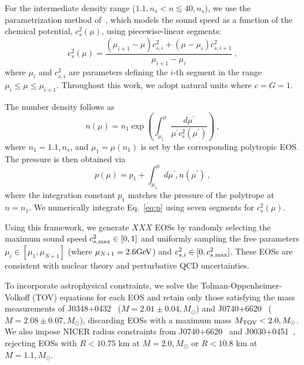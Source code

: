 \documentclass[twocolumn]{aastex631}
\begin{document}
	For the intermediate density range ($1.1,n_s < n \lesssim 40,n_s$), we use the parametrization method of~\citet{Annala2019}, which models the sound speed as a function of the chemical potential, $c_s^2(\mu)$, using piecewise-linear segments:
	\begin{equation} \label{eq:cs2}
		c_s^2(\mu) = \frac{\left(\mu_{i+1}-\mu \right) c_{s,i}^2 + \left(\mu - \mu_i \right) c_{s,i+1}^2}{\mu_{i+1}-\mu_i}~, 
	\end{equation}
	where $\mu_i$ and $c_{s,i}^2$ are parameters defining the $i$-th segment in the range $\mu_i \leq \mu \leq \mu_{i+1}$.
	Throughout this work, we adopt natural units where $c=G=1$.
	
	The number density follows as 
	\begin{equation} \label{eq:n}
		n(\mu) = n_1 \exp \left({\int_{\mu_1}^\mu \frac{d\mu^\prime}{\mu^\prime c_s^2(\mu^\prime)}}\right)~, 
	\end{equation} where $n_1 = 1.1,n_s$, and $\mu_1 = \mu(n_1)$ is set by the corresponding polytropic EOS.
	The pressure is then obtained via
	\begin{equation} \label{eq:p}
		p(\mu) = p_1 + \int_{\mu_1}^\mu d\mu^\prime , n(\mu^\prime)~,
	\end{equation}
	where the integration constant $p_1$ matches the pressure of the polytrope at $n = n_1$.
	We numerically integrate Eq.~\eqref{eq:p} using seven segments for $c_s^2(\mu)$.
	
	Using this framework, we generate $XXX$ EOSs by randomly selecting the maximum sound speed $c_{s,{\rm max}}^2 \in [0,1]$ and uniformly sampling the free parameters $\mu_i \in [\mu_1, \mu_{N+1}]$ (where $\mu_{N+1} = 2.6\rm GeV$) and $c_{s,i}^2 \in [0, c_{s,{\rm max}}^2]$. These EOSs are consistent with nuclear theory and perturbative QCD uncertainties.
	
	To incorporate astrophysical constraints, we solve the Tolman-Oppenheimer-Volkoff (TOV) equations for each EOS and retain only those satisfying the mass measurements of J0348+0432~\citep{Antoniadis2013} ($M = 2.01\pm 0.04,M_{\odot}$) and J0740+6620~\citep{Cromartie2019, Fonseca2021} ($M = 2.08 \pm 0.07,M_{\odot}$), discarding EOSs with a maximum mass $M_{\rm TOV} < 2.0,M_{\odot}$. We also impose NICER radius constraints from J0740+6620~\citep{Miller2021, Riley2021} and J0030+0451~\citep{Riley2019, MCMiller2019b}, rejecting EOSs with $R < 10.75$ km at $M = 2.0,M_{\odot}$ or $R < 10.8$ km at $M = 1.1,M_{\odot}$.
	
\end{document}
